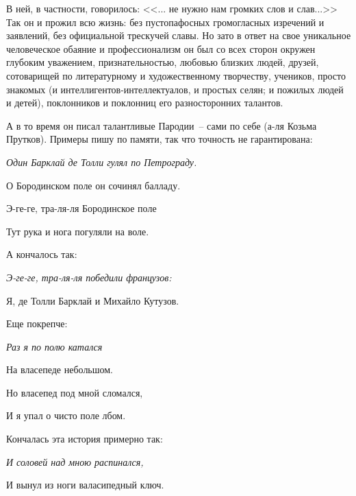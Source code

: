 В ней, в частности, говорилось: <<... не нужно нам громких слов и слав...>> Так он и прожил всю жизнь: без пустопафосных громогласных изречений и заявлений, без официальной трескучей славы. Но зато в ответ на свое уникальное человеческое обаяние и профессионализм он был со всех сторон окружен глубоким уважением, признательностью, любовью близких людей, друзей, сотоварищей по литературному и художественному творчеству, учеников, просто знакомых (и интеллигентов-интеллектуалов, и простых селян; и пожилых людей и детей), поклонников и поклонниц его разносторонних талантов.

А в то время он писал талантливые Пародии~-- сами по себе (а-ля Козьма Прутков). Примеры пишу по памяти, так что точность не гарантирована:

\vspace{10pt}

{\itshape
	Один Барклай де Толли гулял по Петрограду.
	
    О Бородинском поле он сочинял балладу.
    
    Э-ге-ге, тра-ля-ля Бородинское поле
    
    Тут рука и нога погуляли на воле.

}

\indent

\noindent
А кончалось так:

    \vspace{10pt}

{\itshape
	Э-ге-ге, тра-ля-ля победили французов:
	
	Я, де Толли Барклай и Михайло Кутузов.
}

\indent

\noindent
Еще покрепче:

    \vspace{10pt}

{\itshape
	Раз я по полю катался
	
	На власепеде небольшом.
	
	Но власепед под мной сломался,
	
	И я упал о чисто поле лбом.
}

\indent

\noindent
Кончалась эта история примерно так:

\vspace{5pt}

{\itshape
	И соловей над мною распинался,
	
	И вынул из ноги валасипедный ключ.	
}	

\indent

